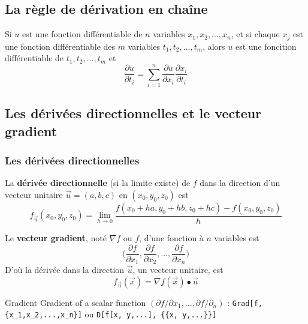 	\subsection{La règle de dérivation en chaîne}
		\begin{mythm}
			Si $u$ est une fonction différentiable de $n$ variables $x_1,x_2,...,x_n$, et si chaque $x_j$ est une fonction différentiable des $m$ variables $t_1,t_2,...,t_m$, alors $u$ est une foncition différentiable de $t_1,t_2,...,t_m$ et
			\[\frac{\partial u}{\partial t_i}=\sum_{i=1}^{n}\frac{\partial u}{\partial x_i}\frac{\partial x_i}{\partial t_i}\] 
		\end{mythm}
	\subsection{Les dérivées directionnelles et le vecteur gradient}
		\subsubsection*{Les dérivées directionnelles}
			\begin{mydef}
				La \textbf{dérivée directionnelle} (si la limite existe) de $f$ dans la direction d'un vecteur unitaire $\vec{u}=(a,b,c)$ en $(x_0,y_0,z_0)$ est \[f_{\vec{u}}(x_0,y_0,z_0)=\lim_{h\to 0}\frac{f(x_0+ha,y_0+hb,z_0+hc)-f(x_0,y_0,z_0)}{h}\]
			\end{mydef}
			\begin{mydef}
				Le \textbf{vecteur gradient}, noté $\nabla f$ ou  $f$, d'une fonction à $n$ variables est \[\Big(\frac{\partial f}{\partial x_1},\frac{\partial f}{\partial x_2},...,\frac{\partial f}{\partial x_n}\Big)\]
				D'où la dérivée dans la direction $\vec{u}$, un vecteur unitaire, est \[f_{\vec{u}}(\vec{x})=\nabla f(\vec{x})\bullet \vec{u}\]
			\end{mydef}
			\begin{code}{Gradient}
			Gradient of a scalar function $(\partial f / \partial x_1,...,\partial f / \partial _n)$ : \verb|Grad[f,{x_1,x_2,...,x_n}]| ou \verb|D[f[x, y,...], {{x, y,...}}]|
		\end{code}
